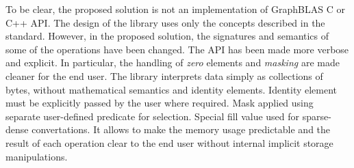 To be clear, the proposed solution is not an implementation of GraphBLAS C or C++ API. 
The design of the library uses only the concepts described in the standard. 
However, in the proposed solution, the signatures and semantics of some of the operations have been changed. 
The API has been made more verbose and explicit. 
In particular, the handling of \textit{zero} elements and \textit{masking} are made cleaner for the end user. The library interprets data simply as collections of bytes, without mathematical semantics and identity elements.
Identity element must be explicitly passed by the user where required. Mask applied using separate user-defined predicate for selection. Special fill value used for sparse-dense convertations. It allows to make the memory usage predictable and the result of each operation clear to the end user without internal implicit storage manipulations.